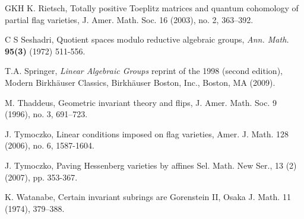 \documentclass[12pt, reqno]{amsart}
\theoremstyle{plain}
\numberwithin{equation}{section}
\theoremstyle{definition}
\begin{document}
\begin{thebibliography}{GKH}
 K. Rietsch, Totally positive Toeplitz matrices and quantum cohomology
of partial flag varieties, J. Amer. Math. Soc. 16 (2003), no. 2, 363–392.

	 C S Seshadri, {Quotient spaces modulo reductive algebraic groups,} {\em Ann. Math.} {\bf 95(3)} (1972) 511-556.

 T.A. Springer, {\em
Linear Algebraic Groups}
reprint of the 1998
(second edition), Modern Birkhäuser Classics, Birkh\"auser Boston, Inc., Boston, MA (2009).

 M. Thaddeus, Geometric invariant theory and flips, J. Amer. Math. Soc. 9 (1996), no. 3, 691–723.

 J. Tymoczko, Linear conditions imposed on flag varieties, Amer. J. Math. 128 (2006), no. 6, 1587-1604.

 J. Tymoczko, Paving Hessenberg varieties by affines
Sel. Math. New Ser., 13 (2) (2007), pp. 353-367.

 K. Watanabe,  Certain invariant subrings are Gorenstein II, Osaka J. Math. 11 (1974), 379–388. 



\end{thebibliography}	
\end{document}
